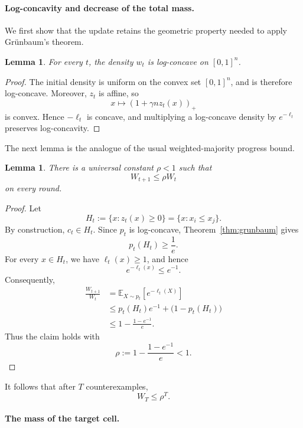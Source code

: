 \documentclass[11pt]{article}
\newtheorem{lemma}[theorem]{Lemma}
\theoremstyle{definition}
\theoremstyle{remark}
\begin{document}
\paragraph{Log-concavity and decrease of the total mass.}

We first show that the update retains the geometric property needed to apply
Gr\"unbaum's theorem.

\begin{lemma}
\label{lem:logconcave}
For every $t$, the density $w_t$ is log-concave on $[0,1]^n$.
\end{lemma}

\begin{proof}
The initial density is uniform on the convex set $[0,1]^n$, and is therefore
log-concave. Moreover, $z_t$ is affine, so
\[
    x\longmapsto (1+\gamma n z_t(x))_+
\]
is convex. Hence $-\ell_t$ is concave, and multiplying a log-concave
density by $e^{-\ell_t}$ preserves log-concavity.
\end{proof}

The next lemma is the analogue of the usual weighted-majority progress
bound.

\begin{lemma}
\label{lem:total-mass}
There is a universal constant $\rho<1$ such that
\[
    W_{t+1}\leq \rho W_t
\]
on every round.
\end{lemma}

\begin{proof}
Let
\[
    H_t:=\{x:z_t(x)\geq0\}
        =\{x:x_i\leq x_j\}.
\]
By construction, $c_t\in H_t$. Since $p_t$ is log-concave,
Theorem~\ref{thm:grunbaum} gives
\[
    p_t(H_t)\geq\frac1e.
\]
For every $x\in H_t$, we have $\ell_t(x)\geq1$, and hence
\[
    e^{-\ell_t(x)}\leq e^{-1}.
\]
Consequently,
\begin{align*}
    \frac{W_{t+1}}{W_t}
    &=
    \mathbb E_{X\sim p_t}
        \left[e^{-\ell_t(X)}\right] \\
    &\leq
    p_t(H_t)e^{-1}+
    \bigl(1-p_t(H_t)\bigr)\\
    &\leq
    1-\frac{1-e^{-1}}{e}.
\end{align*}
Thus the claim holds with
\[
    \rho:=1-\frac{1-e^{-1}}{e}<1.
\]
\end{proof}

It follows that after $T$ counterexamples,
\[
    W_T\leq\rho^T.
    \tag{2}\label{eq:total-mass-upper}
\]


\paragraph{The mass of the target cell.}
\end{document}
